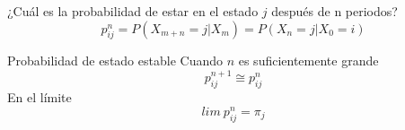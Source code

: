 \begin{frame}{¿Cuál es la probabilidad de estar en el estado $j$ después de n periodos?}
	$$
	p_{ij}^n=P(X_{m+n}=j|X_m)=P(X_n=j|X_0=i)
	$$
\end{frame}

\begin{frame}{Probabilidad de estado estable}
	Cuando $n$ es suficientemente grande
	$$
	p_{ij}^{n+1}\cong p_{ij}^n
	$$
	\pause
	En el límite
	$$
	lim ~  p_{ij}^n = \pi_j 
	$$
\end{frame}